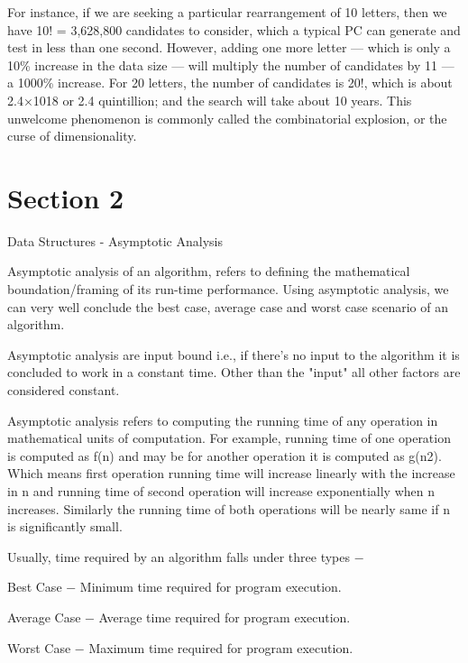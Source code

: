\begin{frame}
For instance, if we are seeking a particular rearrangement of 10 letters, then we have 10! = 3,628,800 candidates to consider, which a typical PC can generate and test in less than one second. However, adding one more letter — which is only a 10\% increase in the data size — will multiply the number of candidates by 11 — a 1000\% increase. For 20 letters, the number of candidates is 20!, which is about 2.4×1018 or 2.4 quintillion; and the search will take about 10 years. This unwelcome phenomenon is commonly called the combinatorial explosion, or the curse of dimensionality.
\end{frame}
\section{Section 2}
\begin{frame}

Data Structures - Asymptotic Analysis
 
Asymptotic analysis of an algorithm, refers to defining the mathematical boundation/framing of its run-time performance. Using asymptotic analysis, we can very well conclude the best case, average case and worst case scenario of an algorithm.

Asymptotic analysis are input bound i.e., if there's no input to the algorithm it is concluded to work in a constant time. Other than the "input" all other factors are considered constant.

Asymptotic analysis refers to computing the running time of any operation in mathematical units of computation. For example, running time of one operation is computed as f(n) and may be for another operation it is computed as g(n2). Which means first operation running time will increase linearly with the increase in n and running time of second operation will increase exponentially when n increases. Similarly the running time of both operations will be nearly same if n is significantly small.
\end{frame}
\begin{frame}

Usually, time required by an algorithm falls under three types −

Best Case − Minimum time required for program execution.

Average Case − Average time required for program execution.

Worst Case − Maximum time required for program execution.
\end{frame}
